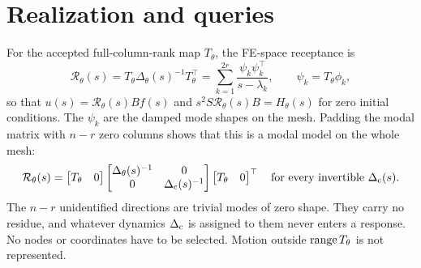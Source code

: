 \section{Realization and queries}\label{sec:realization}
For the accepted full-column-rank map $T_\theta$, the FE-space receptance is
\begin{equation}
 \mathcal R_\theta(s)=T_\theta\Delta_\theta(s)^{-1}T_\theta^{\top}
 =\sum_{k=1}^{2r}\frac{\psi_k\psi_k^{\top}}{s-\lambda_k},\qquad
 \psi_k=T_\theta\phi_k,
 \label{eq:receptance}
\end{equation}
so that $u(s)=\mathcal R_\theta(s)Bf(s)$ and
$s^2S\mathcal R_\theta(s)B=H_\theta(s)$ for zero initial conditions. The
$\psi_k$ are the damped mode shapes on the mesh. Padding the modal matrix
with $n-r$ zero columns shows that this is a modal model on the whole mesh:
\begin{equation}
 \mathcal R_\theta(s)=\begin{bmatrix}T_\theta&0\end{bmatrix}
 \begin{bmatrix}\Delta_\theta(s)^{-1}&0\\0&\Delta_{\rm c}(s)^{-1}\end{bmatrix}
 \begin{bmatrix}T_\theta&0\end{bmatrix}^{\top}
 \quad\text{for every invertible }\Delta_{\rm c}(s).
 \label{eq:trivial-modes}
\end{equation}
The $n-r$ unidentified directions are trivial modes of zero shape. They
carry no residue, and whatever dynamics $\Delta_{\rm c}$ is assigned to them
never enters a response. No nodes or coordinates have to be selected. Motion
outside $\operatorname{range} T_\theta$ is not represented.

